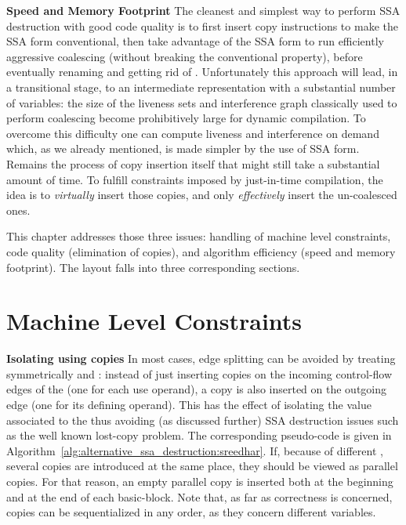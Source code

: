 {\bf Speed and Memory Footprint} 
The cleanest and simplest way to perform SSA destruction with good code quality is to first insert copy instructions to make the SSA form conventional, then take advantage of the SSA form to run efficiently aggressive coalescing (without breaking the conventional property), before eventually renaming \phiwebs\index{\phiweb} and getting rid of \phifuns. Unfortunately this approach will lead, in a transitional stage, to an intermediate representation with a substantial number of variables: the size of the liveness sets and interference graph classically used to perform coalescing become prohibitively large for dynamic compilation. To overcome this difficulty one can compute liveness and interference on demand which, as we already mentioned, is made simpler by the use of SSA form. Remains the process of copy insertion itself that might still take a substantial amount of time. To fulfill constraints imposed by just-in-time compilation, the idea is to \emph{virtually} insert those copies, and only \emph{effectively} insert the un-coalesced ones.    

This chapter addresses those three issues: handling of machine level constraints, code quality (elimination of copies), and algorithm efficiency (speed and memory footprint). The layout falls into three corresponding sections.

\section{Machine Level Constraints}

{\bf Isolating \phinode using copies}
In most cases, edge splitting can be avoided by treating symmetrically \phiuses and \phidef: instead of just inserting copies on the incoming control-flow edges of the \phinode (one for each use operand), a copy is also inserted on the outgoing edge (one for its defining operand). This has the effect of isolating the value associated to the \phinode thus avoiding (as discussed further) SSA destruction issues such as the well known lost-copy problem.
The corresponding pseudo-code is given in Algorithm~\ref{alg:alternative_ssa_destruction:sreedhar}. If, because of different \phifuns, several copies are introduced at the
same place, they should be viewed as parallel copies. For that reason, an empty parallel copy is inserted both at the beginning and at the end of each basic-block.  
Note that, as far as correctness is concerned, copies
can be sequentialized in any order, as they concern different
variables. 

